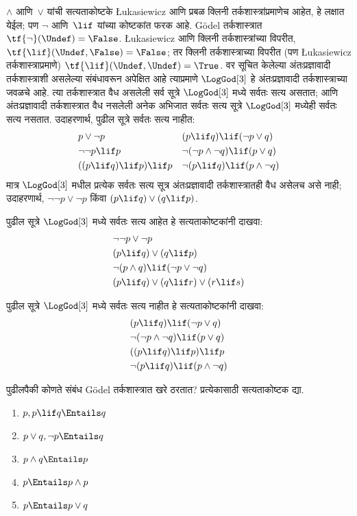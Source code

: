 $\land$ आणि~$\lor$ यांची सत्यताकोष्टके \L ukasiewicz
आणि प्रबळ क्लिनी तर्कशास्त्रांप्रमाणेच आहेत, हे लक्षात येईल;
पण $\lnot$ आणि~$\lif$ यांच्या कोष्टकांत फरक आहे.
G\"odel तर्कशास्त्रात $\tf{\lnot}(\Undef) = \False$.
\L ukasiewicz आणि क्लिनी तर्कशास्त्रांच्या विपरीत,
$\tf{\lif}(\Undef, \False) = \False$; तर क्लिनी
तर्कशास्त्राच्या विपरीत (पण \L ukasiewicz तर्कशास्त्राप्रमाणे)
$\tf{\lif}(\Undef, \Undef) = \True$.
वर सूचित केलेल्या अंतःप्रज्ञावादी तर्कशास्त्राशी असलेल्या
संबंधावरून अपेक्षित आहे त्याप्रमाणे $\LogGod[3]$ हे
अंतःप्रज्ञावादी तर्कशास्त्राच्या जवळचे आहे. त्या तर्कशास्त्रात
वैध असलेली सर्व सूत्रे $\LogGod[3]$ मध्ये सर्वतः सत्य
असतात; आणि अंतःप्रज्ञावादी तर्कशास्त्रात वैध नसलेली अनेक
अभिजात सर्वतः सत्य सूत्रे $\LogGod[3]$ मध्येही सर्वतः
सत्य नसतात. उदाहरणार्थ, पुढील सूत्रे सर्वतः सत्य नाहीत:
\begin{align*}
  & p \lor \lnot p && (p \lif q) \lif (\lnot p \lor q) \\
  & \lnot\lnot p \lif p && \lnot(\lnot p \land \lnot q) \lif (p \lor q) \\
  & ((p \lif q) \lif p) \lif p && \lnot(p \lif q) \lif (p \land \lnot q)
\end{align*}
मात्र $\LogGod[3]$ मधील प्रत्येक सर्वतः सत्य सूत्र
अंतःप्रज्ञावादी तर्कशास्त्रातही वैध असेलच असे नाही;
उदाहरणार्थ, $\lnot\lnot p \lor \lnot p$ किंवा $(p
\lif q) \lor (q \lif p)$.
\begin{prob}
  पुढील सूत्रे $\LogGod[3]$ मध्ये सर्वतः सत्य आहेत हे
  सत्यताकोष्टकांनी दाखवा:
  \begin{align*}
    & \lnot\lnot p \lor \lnot p\\
    & (p \lif q) \lor (q \lif p) \\
    & \lnot(p \land q) \lif (\lnot p \lor \lnot q) \\
    & (p \lif q) \lor (q \lif r) \lor (r \lif s)
  \end{align*}
\end{prob}
\begin{prob}
  पुढील सूत्रे $\LogGod[3]$ मध्ये सर्वतः सत्य नाहीत हे
  सत्यताकोष्टकांनी दाखवा:
  \begin{align*}
    & (p \lif q) \lif (\lnot p \lor q) \\
    & \lnot(\lnot p \land \lnot q) \lif (p \lor q) \\
    & ((p \lif q) \lif p) \lif p \\
    & \lnot(p \lif q) \lif (p \land \lnot q)
  \end{align*}
\end{prob}
\begin{prob}
  पुढीलपैकी कोणते संबंध G\"odel तर्कशास्त्रात खरे ठरतात?
  प्रत्येकासाठी सत्यताकोष्टक द्या.
  \begin{enumerate}
    \item $p, p \lif q \Entails q$
    \item $p \lor q, \lnot p \Entails q$
    \item $p \land q \Entails p$
    \item $p \Entails p \land p$
    \item $p \Entails p \lor q$
  \end{enumerate}
\end{prob}

